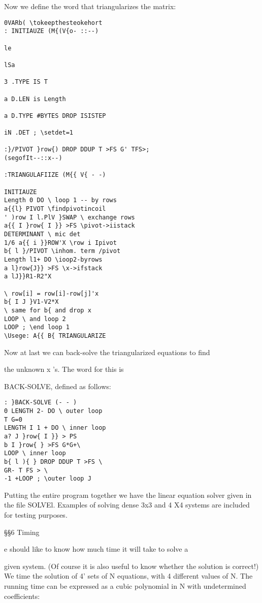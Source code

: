 {{Now we define the word that triangularizes the matrix:
\begin{verbatim}
0VARb( \tokeepthesteokehort
: INITIAUZE (M{(V{o- ::--)

le

lSa

3 .TYPE IS T

a D.LEN is Length

a D.TYPE #BYTES DROP ISISTEP

iN .DET ; \setdet=1

:}/PIVOT }row{) DROP DDUP T >FS G' TFS>;
(segofIt--::x--)

:TRIANGULAFIIZE (M{{ V{ - -)

INITIAUZE
Length 0 DO \ loop 1 -- by rows
a{{l} PIVOT \findpivotincoil
' )row I l.PlV }SWAP \ exchange rows
a{{ I }row{ I }} >FS \pivot->iistack
DETERMINANT \ mic det
1/6 a{{ i }}ROW'X \row i Ipivot
b{ l }/PIVOT \inhom. term /pivot
Length l1+ DO \ioop2-byrows
a l}row{J}} >FS \x->ifstack
a lJ}}R1-R2"X

\ row[i] = row[i]-row[j]'x
b{ I J }V1-V2*X
\ same for b{ and drop x
LOOP \ and loop 2
LOOP ; \end loop 1
\Usege: A{{ B{ TRIANGULARIZE
\end{verbatim}

Now at last we can back-solve the triangularized equations to find

the unknown x 's. The word for this is }BACK-SOLVE, defined
as follows:


\begin{verbatim}
: }BACK-SOLVE (- - )
0 LENGTH 2- DO \ outer loop
T G=0
LENGTH I 1 + DO \ inner loop
a? J }row{ I }} > PS
b I }row{ } >FS G*G+\
LOOP \ inner loop
b{ l ){ } DROP DDUP T >FS \
GR- T FS > \
-1 +LOOP ; \outer loop J
\end{verbatim} 

Putting the entire program together we have the linear equation
solver given in the file SOLVEl. Examples of solving dense 3x3
and 4 X4 systems are included for testing purposes.

\S\S6 Timing

e should like to know how much time it will take to solve a

given system. (Of course it is also useful to know whether the
solution is correct!) We time the solution of 4' sets of N equations,
with 4 different values of N. The running time can be expressed
as a cubic polynomial in N with undetermined coefficients:

}
